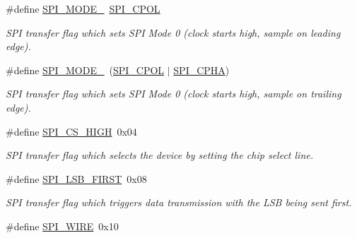 \begin{DoxyCompactItemize}
\#define \mbox{\hyperlink{group__SPILinux_ga8fa3edd8616f8803490c93f09243a612}{S\+P\+I\+\_\+\+M\+O\+D\+E\+\_}}~\mbox{\hyperlink{group__SPILinux_gad8e335b1f808bd7408d2aef2377adcb1}{S\+P\+I\+\_\+\+C\+P\+OL}}
\begin{DoxyCompactList}\small\item\em S\+PI transfer flag which sets S\+PI Mode 0 (clock starts high, sample on leading edge). \end{DoxyCompactList}\item 
\mbox{\label{group__SPILinux_ga6a091da9f9011457fe28ab25f64c858d}} 
\#define \mbox{\hyperlink{group__SPILinux_ga6a091da9f9011457fe28ab25f64c858d}{S\+P\+I\+\_\+\+M\+O\+D\+E\+\_}}~(\mbox{\hyperlink{group__SPILinux_gad8e335b1f808bd7408d2aef2377adcb1}{S\+P\+I\+\_\+\+C\+P\+OL}} $\vert$ \mbox{\hyperlink{group__SPILinux_ga49e8927a636f45641d6231ac63b9e598}{S\+P\+I\+\_\+\+C\+P\+HA}})
\begin{DoxyCompactList}\small\item\em S\+PI transfer flag which sets S\+PI Mode 0 (clock starts high, sample on trailing edge). \end{DoxyCompactList}\item 
\mbox{\label{group__SPILinux_gaec0a952190ad39a42d18cb7b71eb629d}} 
\#define \mbox{\hyperlink{group__SPILinux_gaec0a952190ad39a42d18cb7b71eb629d}{S\+P\+I\+\_\+\+C\+S\+\_\+\+H\+I\+GH}}~0x04
\begin{DoxyCompactList}\small\item\em S\+PI transfer flag which selects the device by setting the chip select line. \end{DoxyCompactList}\item 
\mbox{\label{group__SPILinux_ga8d194446c8ac9f3c878ead3c9382c9e4}} 
\#define \mbox{\hyperlink{group__SPILinux_ga8d194446c8ac9f3c878ead3c9382c9e4}{S\+P\+I\+\_\+\+L\+S\+B\+\_\+\+F\+I\+R\+ST}}~0x08
\begin{DoxyCompactList}\small\item\em S\+PI transfer flag which triggers data transmission with the L\+SB being sent first. \end{DoxyCompactList}\item 
\mbox{\label{group__SPILinux_ga71b275f4427cc817b0a0c16cf5bf82b2}} 
\#define \mbox{\hyperlink{group__SPILinux_ga71b275f4427cc817b0a0c16cf5bf82b2}{S\+P\+I\+\_\+W\+I\+RE}}~0x10

\end{DoxyCompactItemize}
